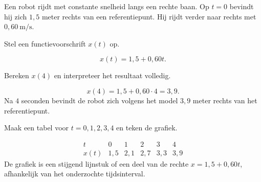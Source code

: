 \documentclass{ximera}
\begin{document}
\begin{oefening}{\oefU\ESS}

Een robot rijdt met constante snelheid langs een rechte baan.
Op \(t=0\) bevindt hij zich \(1{,}5\) meter rechts van een referentiepunt.
Hij rijdt verder naar rechts met \(0{,}60\ \mathrm{m/s}\).

\begin{question}
Stel een functievoorschrift \(x(t)\) op.

\begin{oplossing}
\[
x(t)=1{,}5+0{,}60t.
\]
\end{oplossing}
\end{question}

\begin{question}
Bereken \(x(4)\) en interpreteer het resultaat volledig.

\begin{oplossing}
\[
x(4)=1{,}5+0{,}60\cdot4=3{,}9.
\]
Na \(4\) seconden bevindt de robot zich volgens het model
\(3{,}9\) meter rechts van het referentiepunt.
\end{oplossing}
\end{question}

\begin{question}
Maak een tabel voor \(t=0,1,2,3,4\) en teken de grafiek.

\begin{oplossing}
\[
\begin{array}{c|ccccc}
t&0&1&2&3&4\\
\hline
x(t)&1{,}5&2{,}1&2{,}7&3{,}3&3{,}9
\end{array}
\]
De grafiek is een stijgend lijnstuk of een deel van de rechte
\(x=1{,}5+0{,}60t\), afhankelijk van het onderzochte tijdsinterval.
\end{oplossing}
\end{question}

\end{oefening}

\end{document}
